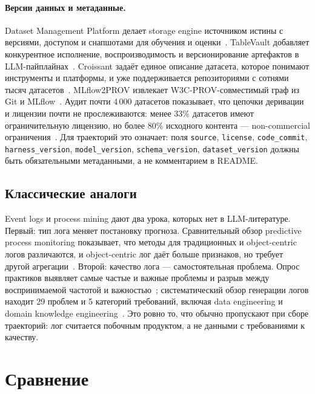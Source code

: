 \documentclass[11pt,a4paper]{article}
\begin{document}
\paragraph{Версии данных и метаданные.}
Dataset Management Platform делает storage engine источником истины с
версиями, доступом и снапшотами для обучения и оценки~\cite{mao2023datasetmgmt}.
TableVault добавляет конкурентное исполнение, воспроизводимость и
версионирование артефактов в LLM-пайплайнах~\cite{zhao2025tablevault}.
Croissant задаёт единое описание датасета, которое понимают инструменты и
платформы, и уже поддерживается репозиториями с сотнями тысяч
датасетов~\cite{akhtar2024croissant}. MLflow2PROV извлекает
W3C-PROV-совместимый граф из Git и MLflow~\cite{schlegel2023mlflow2prov}.
Аудит почти 4\,000 датасетов показывает, что цепочки деривации и лицензии
почти не прослеживаются: менее 33\% датасетов имеют ограничительную
лицензию, но более 80\% исходного контента — non-commercial
ограничения~\cite{longpre2024provenance}. Для траекторий это означает:
поля \texttt{source}, \texttt{license}, \texttt{code\_commit},
\texttt{harness\_version}, \texttt{model\_version}, \texttt{schema\_version},
\texttt{dataset\_version} должны быть обязательными метаданными, а не
комментарием в README.

\subsection{Классические аналоги}

Event logs и process mining дают два урока, которых нет в LLM-литературе.
Первый: тип лога меняет постановку прогноза. Сравнительный обзор
predictive process monitoring показывает, что методы для традиционных и
object-centric логов различаются, и object-centric лог даёт больше
признаков, но требует другой агрегации~\cite{fioretto2025ppm}. Второй:
качество лога — самостоятельная проблема. Опрос практиков выявляет самые
частые и важные проблемы и разрыв между воспринимаемой частотой и
важностью~\cite{dakic2023quality}; систематический обзор генерации логов
находит 29 проблем и 5 категорий требований, включая data engineering и
domain knowledge engineering~\cite{elalaoui2026eventlog}. Это ровно то,
что обычно пропускают при сборе траекторий: лог считается побочным
продуктом, а не данными с требованиями к качеству.

\section{Сравнение}
\end{document}
